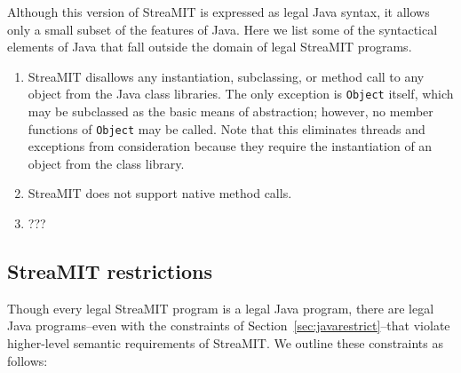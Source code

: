 Although this version of StreaMIT is expressed as legal Java syntax,
it allows only a small subset of the features of Java.  Here we list
some of the syntactical elements of Java that fall outside the domain
of legal StreaMIT programs.
\begin{enumerate}

\item StreaMIT disallows any instantiation, subclassing, or method
call to any object from the Java class libraries.  The only exception
is {\tt Object} itself, which may be subclassed as the basic means of
abstraction; however, no member functions of {\tt Object} may be
called.  Note that this eliminates threads and exceptions from
consideration because they require the instantiation of an object from
the class library.

\item StreaMIT does not support native method calls.

\item ???

\end{enumerate}

\subsection{StreaMIT restrictions}

Though every legal StreaMIT program is a legal Java program, there are
legal Java programs--even with the constraints of
Section~\ref{sec:javarestrict}--that violate higher-level semantic
requirements of StreaMIT.  We outline these constraints as follows:

